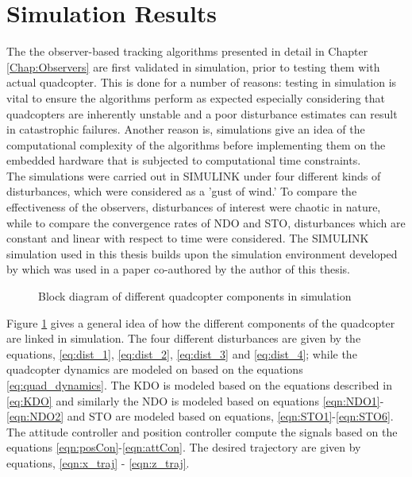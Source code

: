 \documentclass[letterpaper%
, twoside%
, 12pt%
,memoire%
, english%
,creativecommons,hyperref%
]{thETS}
\theoremstyle{newThmStyle}
\begin{document}
\section{Simulation Results} \label{section:SimulationResults}
The the observer-based tracking algorithms presented in detail in Chapter \ref{Chap:Observers} are first validated in simulation, prior to testing them with actual quadcopter. This is done for a number of reasons: testing in simulation is vital to ensure the algorithms perform as expected especially considering that quadcopters are inherently unstable and a poor disturbance estimates can result in catastrophic failures. Another reason is, simulations give an idea of the computational complexity of the algorithms before implementing them on the embedded hardware that is subjected to computational time constraints. \\
The simulations were carried out in SIMULINK under four different kinds of disturbances, which were considered as a 'gust of wind.' To compare the effectiveness of the observers, disturbances of interest were chaotic in nature, while to compare the convergence rates of NDO and STO, disturbances which are constant and linear with respect to time were considered. 
The SIMULINK simulation used in this thesis builds upon the simulation environment developed by \citep{nuradeen2019thesis} which was used in a paper co-authored by the author of this thesis. 
\begin{figure}[H]
	\centering
	\resizebox{0.85\textwidth}{!}{\fbox{}}
	\parbox{0.95\textwidth}{\caption{Block diagram of different quadcopter components in simulation \label{Fig:block_simulation}}}
\end{figure}

Figure \ref{Fig:block_simulation} gives a general idea of how the different components of the quadcopter are linked in simulation. The four different disturbances are given by the equations, \eqref{eq:dist_1}, \eqref{eq:dist_2}, \eqref{eq:dist_3} and \eqref{eq:dist_4}; while the quadcopter dynamics are modeled on based on the equations \eqref{eq:quad_dynamics}. The KDO is modeled based on the equations described in \eqref{eq:KDO} and similarly the NDO is modeled based on equations \eqref{eqn:NDO1}-\eqref{eqn:NDO2} and STO are modeled based on equations, \eqref{eqn:STO1}-\eqref{eqn:STO6}. The attitude controller and position controller compute the signals based on the equations \eqref{eqn:posCon}-\eqref{eqn:attCon}. The desired trajectory are given by equations, \eqref{eqn:x_traj} - \eqref{eqn:z_traj}. 
\end{document}
